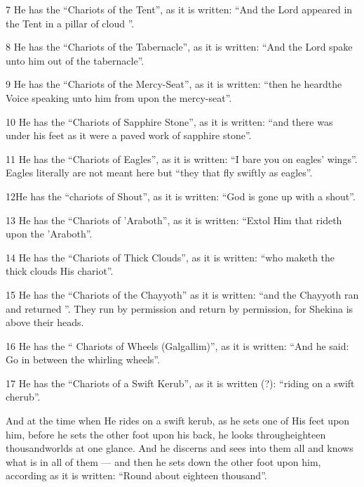 \par 7 He has the “Chariots of the Tent”, as it is written: “And the Lord appeared in the Tent in a pillar of cloud ”.

\par 8 He has the “Chariots of the Tabernacle”, as it is written: “And the Lord spake unto him out of the tabernacle”. 

\par 9 He has the “Chariots of the Mercy-Seat”, as it is written: “then he heardthe Voice speaking unto him from upon the mercy-seat”. 

\par 10 He has the “Chariots of Sapphire Stone”, as it is written: “and there was under his feet as it were a paved work of sapphire stone”. 

\par 11 He has the “Chariots of Eagles”, as it is written: “I bare you on eagles' wings”. Eagles literally are not meant here but “they that fly swiftly as eagles”.

\par 12He has the “chariots of Shout”, as it is written: “God is gone up with a shout”.

\par 13 He has the “Chariots of 'Araboth”, as it is written: “Extol Him that rideth upon the 'Araboth”. 

\par 14 He has the “Chariots of Thick Clouds”, as it is written: “who maketh the thick clouds His chariot”. 

\par 15 He has the “Chariots of the Chayyoth” as it is written: “and the Chayyoth ran and returned ”. They run by permission and return by permission, for Shekina is above their heads.

\par 16 He has the “ Chariots of Wheels (Galgallim)”, as it is written: “And he said: Go in between the whirling wheels”. 

\par 17 He has the “Chariots of a Swift Kerub”, as it is written (?): “riding on a swift cherub”. 

\par And at the time when He rides on a swift kerub, as he sets one of His feet upon him, before he sets the other foot upon his back, he looks througheighteen thousandworlds at one glance. And he discerns and sees into them all and knows what is in all of them — and then he sets down the other foot upon him, according as it is written: “Round about eighteen thousand”. 

